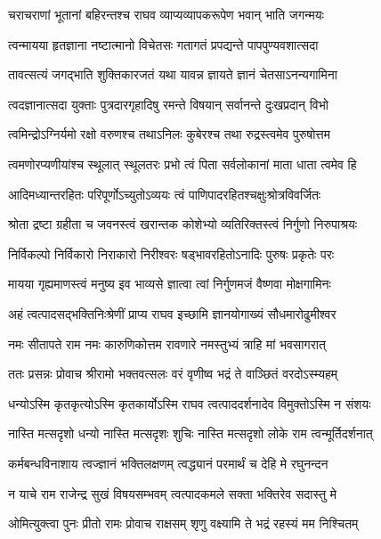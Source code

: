 \twolineshloka
{चराचराणां भूतानां बहिरन्तश्च राघव}
{व्याप्यव्यापकरूपेण भवान् भाति जगन्मयः} %

\twolineshloka
{त्वन्मायया हृतज्ञाना नष्टात्मानो विचेतसः}
{गतागतं प्रपद्यन्ते पापपुण्यवशात्सदा} %

\twolineshloka
{तावत्सत्यं जगद्भाति शुक्तिकारजतं यथा}
{यावन्न ज्ञायते ज्ञानं चेतसाऽनन्यगामिना} %

\twolineshloka
{त्वदज्ञानात्सदा युक्ताः पुत्रदारगृहादिषु}
{रमन्ते विषयान् सर्वानन्ते दुःखप्रदान् विभो} %

\twolineshloka
{त्वमिन्द्रोऽग्निर्यमो रक्षो वरुणश्च तथाऽनिलः}
{कुबेरश्च तथा रुद्रस्त्वमेव पुरुषोत्तम} %

\twolineshloka
{त्वमणोरप्यणीयांश्च स्थूलात् स्थूलतरः प्रभो}
{त्वं पिता सर्वलोकानां माता धाता त्वमेव हि} %

\twolineshloka
{आदिमध्यान्तरहितः परिपूर्णोऽच्युतोऽव्ययः}
{त्वं पाणिपादरहितश्चक्षुःश्रोत्रविवर्जितः} %

\twolineshloka
{श्रोता द्रष्टा ग्रहीता च जवनस्त्वं खरान्तक}
{कोशेभ्यो व्यतिरिक्तस्त्वं निर्गुणो निरुपाश्रयः} %

\twolineshloka
{निर्विकल्पो निर्विकारो निराकारो निरीश्वरः}
{षड्भावरहितोऽनादिः पुरुषः प्रकृतेः परः} %

\twolineshloka
{मायया गृह्यमाणस्त्वं मनुष्य इव भाव्यसे}
{ज्ञात्वा त्वां निर्गुणमजं वैष्णवा मोक्षगामिनः} %

\twolineshloka
{अहं त्वत्पादसद्भक्तिनिःश्रेणीं प्राप्य राघव}
{इच्छामि ज्ञानयोगाख्यं सौधमारोढुमीश्वर} %

\twolineshloka
{नमः सीतापते राम नमः कारुणिकोत्तम}
{रावणारे नमस्तुभ्यं त्राहि मां भवसागरात्} %

\twolineshloka
{ततः प्रसन्नः प्रोवाच श्रीरामो भक्तवत्सलः}
{वरं वृणीष्व भद्रं ते वाञ्छितं वरदोऽस्म्यहम्} %


\twolineshloka
{धन्योऽस्मि कृतकृत्योऽस्मि कृतकार्योऽस्मि राघव}
{त्वत्पाददर्शनादेव विमुक्तोऽस्मि न संशयः} %

\twolineshloka
{नास्ति मत्सदृशो धन्यो नास्ति मत्सदृशः शुचिः}
{नास्ति मत्सदृशो लोके राम त्वन्मूर्तिदर्शनात्} %

\twolineshloka
{कर्मबन्धविनाशाय त्वज्ज्ञानं भक्तिलक्षणम्}
{त्वद्ध्यानं परमार्थं च देहि मे रघुनन्दन} %

\twolineshloka
{न याचे राम राजेन्द्र सुखं विषयसम्भवम्}
{त्वत्पादकमले सक्ता भक्तिरेव सदास्तु मे} %

\twolineshloka
{ओमित्युक्त्वा पुनः प्रीतो रामः प्रोवाच राक्षसम्}
{शृणु वक्ष्यामि ते भद्रं रहस्यं मम निश्चितम्} %

